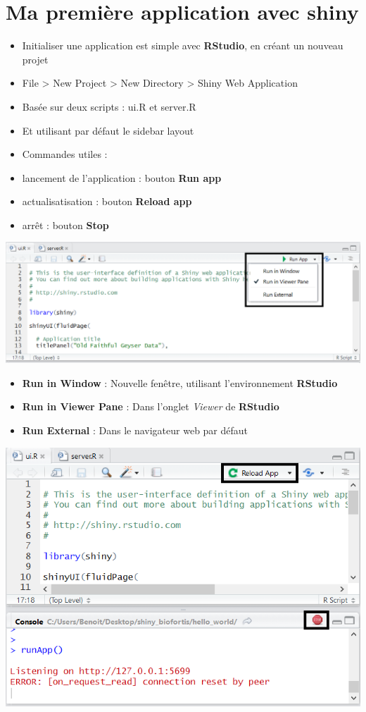 \documentclass[]{article}
\providecommand{\tightlist}{%
  \setlength{\itemsep}{0pt}\setlength{\parskip}{0pt}}
\begin{document}
\section{Ma première application avec
shiny}\label{ma-premiere-application-avec-shiny}

\begin{itemize}
\item
  Initialiser une application est simple avec \textbf{RStudio}, en
  créant un nouveau projet
\item
  File \textgreater{} New Project \textgreater{} New Directory
  \textgreater{} Shiny Web Application
\item
  Basée sur deux scripts : ui.R et server.R
\item
  Et utilisant par défaut le sidebar layout
\item
  Commandes utiles :
\item
  lancement de l'application : bouton \textbf{Run app}
\item
  actualisatisation : bouton \textbf{Reload app}
\item
  arrêt : bouton \textbf{Stop}
\end{itemize}

\includegraphics{img/run_app.png}

\begin{itemize}
\tightlist
\item
  \textbf{Run in Window} : Nouvelle fenêtre, utilisant l'environnement
  \textbf{RStudio}
\item
  \textbf{Run in Viewer Pane} : Dans l'onglet \emph{Viewer} de
  \textbf{RStudio}
\item
  \textbf{Run External} : Dans le navigateur web par défaut
\end{itemize}

\includegraphics{img/stop.png}
\end{document}
